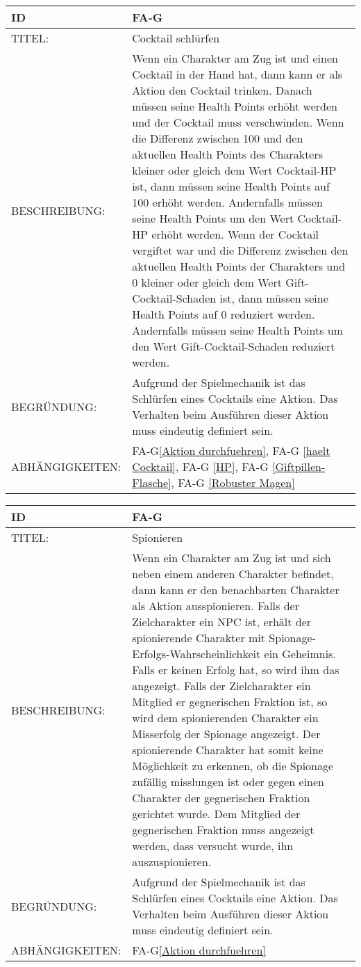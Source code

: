 \begin{tabularx}{16cm}{l|X}
	{table}\label{Cocktail schluerfen}
	\textbf{ID} & \textbf{FA-G\arabic{table}} \\
	\hline
	TITEL: & Cocktail schlürfen \\
	\hline
	BESCHREIBUNG: & Wenn ein Charakter am Zug ist und einen Cocktail in der Hand hat, dann kann er als Aktion den Cocktail trinken. Danach müssen seine Health Points erhöht werden und der Cocktail muss verschwinden. Wenn die Differenz zwischen 100 und den aktuellen Health Points des Charakters kleiner oder gleich dem Wert Cocktail-HP ist, dann müssen seine Health Points auf 100 erhöht werden. Andernfalls müssen seine Health Points um den Wert Cocktail-HP erhöht werden. Wenn der Cocktail vergiftet war und die Differenz zwischen den aktuellen Health Points der Charakters und 0 kleiner oder gleich dem Wert Gift-Cocktail-Schaden ist, dann müssen seine Health Points auf 0 reduziert werden. Andernfalls müssen seine Health Points um den Wert Gift-Cocktail-Schaden reduziert werden. \\
	\hline
	BEGRÜNDUNG: & Aufgrund der Spielmechanik ist das Schlürfen eines Cocktails eine Aktion. Das Verhalten beim Ausführen dieser Aktion muss eindeutig definiert sein.\\
	\hline
	ABHÄNGIGKEITEN: & FA-G\ref{Aktion durchfuehren}, FA-G \ref{haelt Cocktail}, FA-G \ref{HP}, FA-G \ref{Giftpillen-Flasche}, FA-G \ref{Robuster Magen} \\
\end{tabularx}


\begin{tabularx}{16cm}{l|X}
	{table}\label{Spionieren}
	\textbf{ID} & \textbf{FA-G\arabic{table}} \\
	\hline
	TITEL: & Spionieren \\
	\hline
	BESCHREIBUNG: & Wenn ein Charakter am Zug ist und sich neben einem anderen Charakter befindet, dann kann er den benachbarten Charakter als Aktion ausspionieren. Falls der Zielcharakter ein NPC ist, erhält der spionierende Charakter mit Spionage-Erfolgs-Wahrscheinlichkeit ein Geheimnis. Falls er keinen Erfolg hat, so wird ihm das angezeigt.
	Falls der Zielcharakter ein Mitglied er gegnerischen Fraktion ist, so wird dem spionierenden Charakter ein Misserfolg der Spionage angezeigt. Der spionierende Charakter hat somit keine Möglichkeit zu erkennen, ob die Spionage zufällig misslungen ist oder gegen einen Charakter der gegnerischen Fraktion gerichtet wurde. Dem Mitglied der gegnerischen Fraktion muss angezeigt werden, dass versucht wurde, ihn auszuspionieren.\\
	 
	\hline
	BEGRÜNDUNG: & Aufgrund der Spielmechanik ist das Schlürfen eines Cocktails eine Aktion. Das Verhalten beim Ausführen dieser Aktion muss eindeutig definiert sein.\\
	\hline
	ABHÄNGIGKEITEN: & FA-G\ref{Aktion durchfuehren} \\
\end{tabularx}

